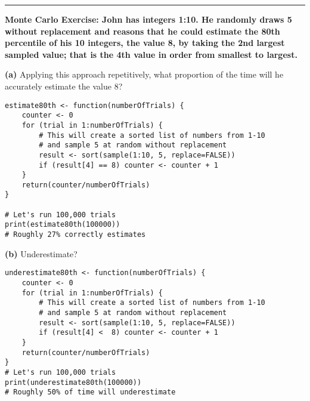 \documentclass[11pt]{article}
\newcommand\question[2]{\vspace{.25in}\hrule\textbf{#1: #2}}
\renewcommand\part[1]{\vspace{.10in}\textbf{(#1)}}
\begin{document}
% 
% 
% 
% 


\question{Monte Carlo Exercise}{John has integers 1:10. He randomly draws 5 without
replacement and reasons that he could estimate the 80th percentile of his 10 integers,
the value 8, by taking the 2nd largest sampled value; that is the 4th value in order
from smallest to largest.}

\part{a} {Applying this approach repetitively, what proportion of the time will
he accurately estimate the value 8?}
\begin{lstlisting}
estimate80th <- function(numberOfTrials) {
    counter <- 0
    for (trial in 1:numberOfTrials) {
        # This will create a sorted list of numbers from 1-10
        # and sample 5 at random without replacement
        result <- sort(sample(1:10, 5, replace=FALSE))
        if (result[4] == 8) counter <- counter + 1
    }
    return(counter/numberOfTrials)
}

# Let's run 100,000 trials
print(estimate80th(100000)) 
# Roughly 27% correctly estimates

\end{lstlisting}

\part{b} {Underestimate?}
\begin{lstlisting}
underestimate80th <- function(numberOfTrials) {
    counter <- 0
    for (trial in 1:numberOfTrials) {
        # This will create a sorted list of numbers from 1-10
        # and sample 5 at random without replacement
        result <- sort(sample(1:10, 5, replace=FALSE))
        if (result[4] <  8) counter <- counter + 1
    }
    return(counter/numberOfTrials)
}
# Let's run 100,000 trials
print(underestimate80th(100000))
# Roughly 50% of time will underestimate
\end{lstlisting}
\end{document}

